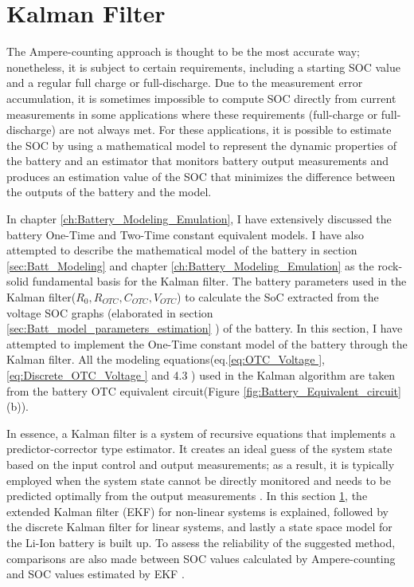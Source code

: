 \section{Kalman Filter}\label{sec:KalamanFilter}
The Ampere-counting approach is thought to be the most accurate way; nonetheless, it is subject to certain requirements, including a starting SOC value and a regular full charge or full-discharge. 
Due to the measurement error accumulation, it is sometimes impossible to compute SOC directly from current measurements in some applications where these requirements (full-charge or full-discharge) are not always met. For these applications, it is possible to estimate the SOC by using a mathematical model to represent the dynamic properties of the battery and an estimator that monitors battery output measurements and produces an estimation value of the SOC that minimizes the difference between the outputs of the battery and the model.

In chapter \ref{ch:Battery_Modeling_Emulation}, I have extensively discussed the battery One-Time and Two-Time constant equivalent models. I have also attempted to describe the mathematical model of the battery in section \ref{sec:Batt_Modeling} and chapter \ref{ch:Battery_Modeling_Emulation} as the rock-solid fundamental basis for the Kalman filter.
The battery parameters used in the Kalman filter($R_0,R_{OTC}, C_{OTC}, V_{OTC}$) to calculate the SoC extracted from the voltage SOC graphs (elaborated in section \ref{sec:Batt_model_parameters_estimation} ) of the battery. In this section, I have attempted to implement the One-Time constant model of the battery through the Kalman filter. All the modeling equations(eq.\ref{eq:OTC_Voltage }, \ref{eq:Discrete_OTC_Voltage } and 4.3 ) used in the Kalman algorithm are taken from the battery OTC equivalent circuit(Figure \ref{fig:Battery_Equivalent_circuit}(b)).

In essence, a Kalman filter is a system of recursive equations that implements a predictor-corrector type estimator. It creates an ideal guess of the system state based on the input control and output measurements; as a result, it is typically employed when the system state cannot be directly monitored and needs to be predicted optimally from the output measurements \cite{SOC_Estimation_KalmanFilter_Ahmad}.
In this section \ref{sec:KalamanFilter}, the extended Kalman filter (EKF) for non-linear systems is explained, followed by the discrete Kalman filter for linear systems, and lastly a state space model for the Li-Ion battery is built up. To assess the reliability of the suggested method, comparisons are also made between SOC values calculated by Ampere-counting and SOC values estimated by EKF \cite{SOC_Estimation_KalmanFilter_Liu}.

